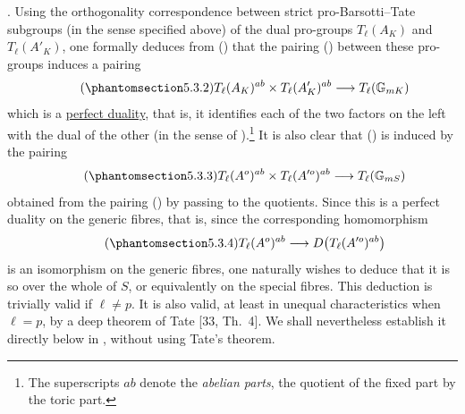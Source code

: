 
\medskip
\noindent
{}. Using the orthogonality correspondence between strict
pro-Barsotti--Tate subgroups (in the sense specified above) of the dual
pro-groups $T_\ell(A_K)$ and $T_\ell(A'_K)$, one formally deduces
from () that the pairing () between these pro-groups induces a
pairing
\begin{equation}\tag{\SGARefTarget{sga7.sga7i.eix.n5-3-2}{5.3.2}}
 T_\ell(A_K)^{ab}\times T_\ell(A'_K)^{ab}
 \longrightarrow T_\ell(\mathbb G_{mK})
\end{equation}
which is a \underline{perfect duality}, that is, it identifies each of
the two factors on the left with the dual of the other (in the sense of
).\footnote{The superscripts $ab$ denote the \emph{abelian
parts}, the quotient of the fixed part by the toric part.}  It is also
clear that () is induced by the pairing
\begin{equation}\tag{\SGARefTarget{sga7.sga7i.eix.n5-3-3}{5.3.3}}
 T_\ell(A^o)^{ab}\times T_\ell(A^{\prime o})^{ab}
 \longrightarrow T_\ell(\mathbb G_{mS})
\end{equation}
obtained from the pairing () by passing to the quotients.  Since
this is a perfect duality on the generic fibres, that is, since the
corresponding homomorphism
\begin{equation}\tag{\SGARefTarget{sga7.sga7i.eix.n5-3-4}{5.3.4}}
 T_\ell(A^o)^{ab}
 \longrightarrow D\bigl(T_\ell(A^{\prime o})^{ab}\bigr)
\end{equation}
is an isomorphism on the generic fibres, one naturally wishes to deduce
that it is so over the whole of $S$, or equivalently on the special
fibres.  This deduction is trivially valid if $\ell\neq p$.  It is
also valid, at least in unequal characteristics when $\ell=p$, by a
deep theorem of Tate [33, Th.\ 4].  We shall nevertheless establish it
directly below in , without using Tate's theorem.

